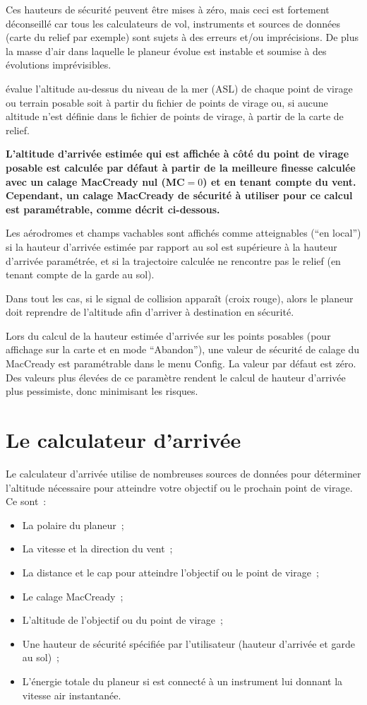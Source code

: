 \warning{}
Ces hauteurs de sécurité peuvent être mises à zéro, mais ceci est fortement déconseillé car tous les calculateurs de vol, instruments et sources de données (carte du relief par exemple) sont sujets à des erreurs et/ou imprécisions.
De plus la masse d'air dans laquelle le planeur évolue est instable et soumise à des évolutions imprévisibles.

\xc{} évalue l'altitude au-dessus du niveau de la mer (ASL) de chaque point de virage ou terrain posable soit à partir du fichier de points de virage ou, si aucune altitude n'est définie dans le fichier de points de virage, à partir de la carte de relief.

\textbf{L'altitude d'arrivée estimée qui est affichée à côté du point de virage posable est calculée par défaut à partir de la meilleure finesse calculée avec un calage MacCready nul (MC$=0$) et en tenant compte du vent.
Cependant, un calage MacCready de sécurité à utiliser pour ce calcul est paramétrable, comme décrit ci-dessous.}

Les aérodromes et champs vachables sont affichés comme atteignables (``en local'') si la hauteur d'arrivée estimée par rapport au sol est supérieure à la hauteur d'arrivée paramétrée, et si la trajectoire calculée ne rencontre pas le relief (en tenant compte de la garde au sol).

Dans tout les cas, si le signal de collision apparaît (croix rouge), alors le planeur doit reprendre de l'altitude afin d'arriver à destination en sécurité.

Lors du calcul de la hauteur estimée d'arrivée sur les points posables (pour affichage sur la carte et en mode ``Abandon''), une valeur de sécurité de calage du MacCready est paramétrable dans le menu Config.
La valeur par défaut est zéro.
Des valeurs plus élevées de ce paramètre rendent le calcul de hauteur d'arrivée plus pessimiste, donc minimisant les risques.


\section{Le calculateur d'arrivée}

Le calculateur d'arrivée utilise de nombreuses sources de données pour déterminer l'altitude nécessaire pour atteindre votre objectif ou le prochain point de virage.
Ce sont~:

\begin{itemize}
\item La polaire du planeur~;
\item La vitesse et la direction du vent~;
\item La distance et le cap pour atteindre l'objectif ou le point de virage~;
\item Le calage MacCready~;
\item L'altitude de l'objectif ou du point de virage~;
\item Une hauteur de sécurité spécifiée par l'utilisateur (hauteur d'arrivée et garde au sol)~;
\item L'énergie totale du planeur si \xc{} est connecté à un instrument lui donnant la vitesse air instantanée.
\end{itemize}

